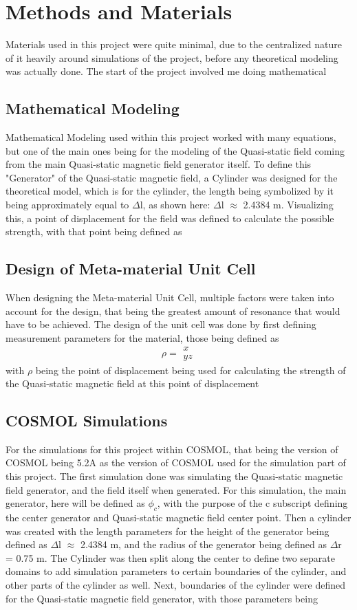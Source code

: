 \documentclass[]{article}
\begin{document}
\section{Methods and Materials} 
Materials used in this project were quite minimal, due to the centralized nature of it heavily around simulations of the project, before any theoretical modeling was actually done. The start of the project involved me doing mathematical 
\subsection{Mathematical Modeling}
Mathematical Modeling used within this project worked with many equations, but one of the main ones being for the modeling of the Quasi-static field coming from the main Quasi-static magnetic field generator itself. To define this "Generator" of the Quasi-static magnetic field, a Cylinder was designed for the theoretical model, which is for the cylinder, the length being symbolized by it being approximately equal to $\Delta$l, as shown here: $\Delta$l $\approx$ 2.4384 m. Visualizing this, a point of displacement for the field was defined to calculate the possible strength, with that point being defined as
\subsection{Design of Meta-material Unit Cell}
When designing the Meta-material Unit Cell, multiple factors were taken into account for the design, that being the greatest amount of resonance that would have to be achieved. The design of the unit cell was done by first defining measurement parameters for the material, those being defined as 
\[ \rho =  \begin{array}{cc}
x  \\ 
y 
z
\end{array} \]
with $\rho$ being the point of displacement being used for calculating the strength of the Quasi-static magnetic field at this point of displacement 
\subsection{COSMOL Simulations}
For the simulations for this project within COSMOL, that being the version of COSMOL being 5.2A as the version of COSMOL used for the simulation part of this project. The first simulation done was simulating the Quasi-static magnetic field generator, and the field itself when generated. For this simulation, the main generator, here will be defined as $\phi_c$, with the purpose of the c subscript defining the center generator and Quasi-static magnetic field center point. Then a cylinder was created with the length parameters for the height of the generator being defined as $\Delta$l $\approx$ 2.4384 m, and the radius of the generator being defined as $\Delta$r = 0.75 m. The Cylinder was then split along the center to define two separate domains to add simulation parameters to certain boundaries of the cylinder, and other parts of the cylinder as well. Next, boundaries of the cylinder were defined for the Quasi-static magnetic field generator, with those parameters being 
\end{document}
